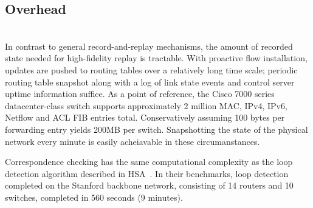\subsection{Overhead}

  \\

 In contrast to general record-and-replay
mechanisms, the amount of recorded state needed for
high-fidelity replay is tractable. With proactive flow installation, 
updates are pushed to routing tables over a relatively long time scale; periodic
routing table snapshot along with a log of link state events and control server uptime information 
suffice. As a point of reference, the Cisco 7000 series datacenter-class
switch supports approximately 2 million MAC, IPv4, IPv6, Netflow and ACL
FIB entries total. Conservatively assuming 100 bytes per forwarding entry
yields 200MB per switch. Snapshotting the state of the physical network every
minute is easily acheiavable in these circumanstances.

 Correspondence checking has
the same computational complexity as the loop detection algorithm described in
HSA~\cite{hsa}. In their benchmarks, loop detection completed on the Stanford
backbone network, consisting of 14 routers and 10 switches, completed in 560 seconds
(9 minutes).

